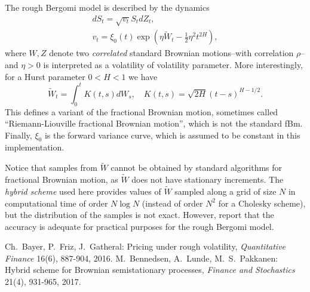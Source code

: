 \documentclass[a4paper]{article}
\renewcommand{\tilde}[1]{\widetilde{#1}}
\begin{document}
The rough Bergomi model is described by the dynamics
\begin{gather*}
  dS_t = \sqrt{v_t} S_t dZ_t,\\
  v_t = \xi_0(t) \exp\left( \eta \tilde{W}_t - \frac{1}{2} \eta^2 t^{2H} \right),
\end{gather*}
where $W, Z$ denote two \emph{correlated} standard Brownian motions--with
correlation $\rho$--and $\eta > 0$ is interpreted as a volatility of volatility parameter. More
interestingly, for a Hurst parameter $0 < H < 1$ we have
\begin{equation*}
  \tilde{W}_t = \int_0^t K(t,s) dW_s, \quad K(t,s) = \sqrt{2H} (t-s)^{H - 1/2}.
\end{equation*}
This defines a variant of the fractional Brownian motion, sometimes called
``Riemann-Liouville fractional Brownian motion'', which is not the standard
fBm. Finally, $\xi_0$ is the forward variance curve, which is assumed to be
constant in this implementation.

Notice that samples from $\tilde{W}$ cannot be obtained by standard algorithms
for fractional Brownian motion, as $\tilde{W}$ does not have stationary increments.
The \emph{hybrid scheme} \cite{BLP} used here provides values of $\tilde{W}$
sampled along a grid of size $N$ in computational time of order $N \log N$
(instead of order $N^2$ for a Cholesky scheme), but the distribution of the
samples is not exact. However, \cite{BLP} report that the accuracy is adequate
for practical purposes for the rough Bergomi model.

\begin{thebibliography}{9}
 Ch.~Bayer, P.~Friz, J.~Gatheral: Pricing under rough
  volatility, \emph{Quantitative Finance} 16(6), 887-904, 2016.
 M.~Bennedsen, A.~Lunde, M.~S.~Pakkanen: Hybrid scheme for
  Brownian semistationary processes, \emph{Finance and Stochastics} 21(4),
  931-965, 2017.
\end{thebibliography}
\end{document}
